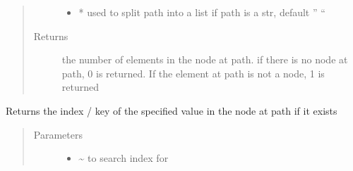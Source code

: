 \documentclass[a4paper,10pt,english]{sphinxmanual}
\begin{document}
\begin{fulllineitems}
\begin{fulllineitems}
\begin{quote}
\begin{description}
\begin{itemize}
\item {}
\sphinxAtStartPar
{} \textendash{} * used to split path into a list if path is a str, default ” “

\end{itemize}

\item[{Returns}] \leavevmode
\sphinxAtStartPar
the number of elements in the node at path. if there is no node at path, 0 is returned. If the element
at path is not a node, 1 is returned

\end{description}\end{quote}

\end{fulllineitems}


\begin{fulllineitems}
\label{\detokenize{fagus.fagus:fagus.fagus.Fagus.index}}
\pysigstartsignatures
{}
\pysigstopsignatures
\sphinxAtStartPar
Returns the index / key of the specified value in the node at path if it exists
\begin{quote}\begin{description}
\item[{Parameters}] \leavevmode\begin{itemize}
\item {}
\sphinxAtStartPar
{} \textendash{} \textasciitilde{} to search index for


\end{itemize}
\end{description}
\end{quote}
\end{fulllineitems}
\end{fulllineitems}
\end{document}

